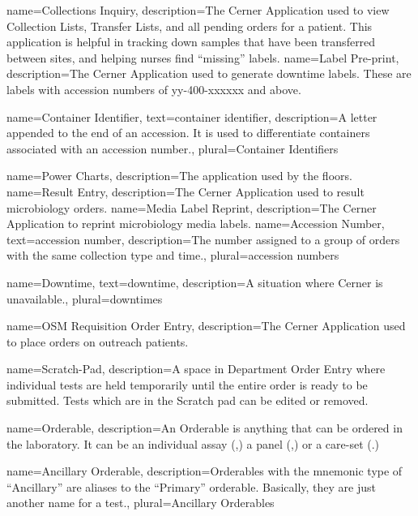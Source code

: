 {
    name={Collections Inquiry},
    description={The Cerner Application used to view Collection Lists, Transfer Lists, and all pending orders for a patient. This application is helpful in tracking down samples that have been transferred between sites, and helping nurses find ``missing'' labels.}
}
{
    name={Label Pre-print},
    description={The Cerner Application used to generate downtime labels. These are labels with accession numbers of yy-400-xxxxxx and above.}
}

{
    name={Container Identifier},
    text={container identifier},
    description={A letter appended to the end of an accession. It is used to differentiate containers associated with an accession number.},
    plural={Container Identifiers}
}

{
    name={Power Charts},
    description={The application used by the floors.}
}
{
    name={Result Entry},
    description={The Cerner Application used to result microbiology orders.}
}
{
    name={Media Label Reprint},
    description={The Cerner Application to reprint microbiology media labels.}
}
{
    name={Accession Number},
    text={accession number},
    description={The number assigned to a group of orders with the same collection type and time.},
    plural={accession numbers}
}

{
    name={Downtime},
    text={downtime},
    description={A situation where Cerner is unavailable.},
    plural={downtimes}
}

{
    name={OSM Requisition Order Entry},
    description={The Cerner Application used to place orders on outreach patients.}
}

{
    name={Scratch-Pad},
    description={A space in Department Order Entry where individual tests are held temporarily until the entire order is ready to be submitted. Tests which are in the Scratch pad can be edited or removed.}
}

{
    name={Orderable},
    description={An Orderable is anything that can be ordered in the laboratory. It can be an individual assay (,) a panel (,) or a care-set (.)}
}

{
    name={Ancillary Orderable},
    description={Orderables with the mnemonic type of ``Ancillary'' are aliases to the ``Primary'' orderable. Basically, they are just another name for a test.},
    plural=Ancillary Orderables
}

